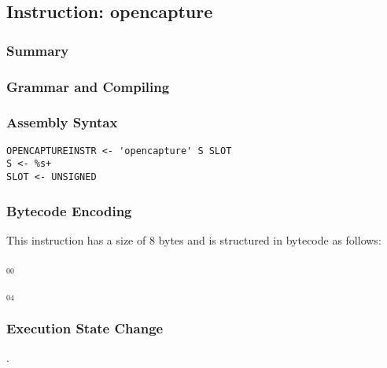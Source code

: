 \subsection{Instruction: opencapture}

\subsubsection{Summary}


\subsubsection{Grammar and Compiling}


\subsubsection{Assembly Syntax}

\begin{myquote}
\begin{verbatim}
OPENCAPTUREINSTR <- 'opencapture' S SLOT
S <- %s+
SLOT <- UNSIGNED
\end{verbatim}
\end{myquote}


\subsubsection{Bytecode Encoding}

This instruction has a size of 8 bytes and is structured in bytecode as follows:

$_{00}$\ 



$_{04}$\ 


\subsubsection{Execution State Change}

.



